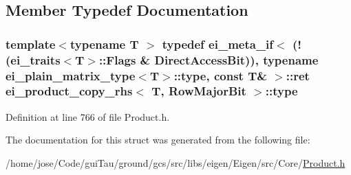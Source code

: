 \subsection{Member Typedef Documentation}
\hypertarget{structei__product__copy__rhs_3_01_t_00_01_row_major_bit_01_4_a06f5fdf9714d811afdd723824febc8ee}{
\subsubsection[{type}]{\setlength{\rightskip}{0pt plus 5cm}template$<$typename T $>$ typedef {\bf ei\-\_\-meta\-\_\-if}$<$ (!({\bf ei\-\_\-traits}$<$T$>$\-::Flags \& {\bf Direct\-Access\-Bit})), typename {\bf ei\-\_\-plain\-\_\-matrix\-\_\-type}$<$T$>$\-::{\bf type}, const T\& $>$\-::{\bf ret} {\bf ei\-\_\-product\-\_\-copy\-\_\-rhs}$<$ T, {\bf Row\-Major\-Bit} $>$\-::{\bf type}}}\label{structei__product__copy__rhs_3_01_t_00_01_row_major_bit_01_4_a06f5fdf9714d811afdd723824febc8ee}


Definition at line 766 of file Product.\-h.



The documentation for this struct was generated from the following file\-:\begin{DoxyCompactItemize}
\item 
/home/jose/\-Code/gui\-Tau/ground/gcs/src/libs/eigen/\-Eigen/src/\-Core/\hyperlink{_product_8h}{Product.\-h}\end{DoxyCompactItemize}
